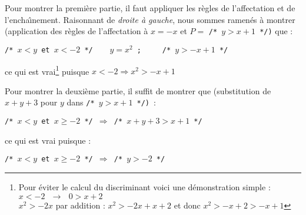 Pour montrer la premi\`ere partie, il faut appliquer les r\`egles de l'affectation
et de l'encha\^\i nement. Raisonnant de {\em droite \`a gauche}, nous sommes ramen\'es
\`a montrer (application des r\`egles de l'affectation \`a $x = -x$ et $P =$
{\tt  /* $y > x+1$ */)} que :
 
 {\tt /* $x<y$ et $x<-2$ */~~~~$y = x^{2}$ ; ~~~~/* $y>-x+1$ */ }

 ce qui est vrai\footnote{ Pour \'eviter le calcul du discriminant
 voici une d\'emonstration simple :
$  x < -2  \mbox{    }\rightarrow \mbox{    }  0 > x + 2  $\\ 
 $  x^{2} > -2x $ 
 par addition :
 $  x^{2}  > -2x +x +2 $ 
 et donc $ x^{2} > -x + 2 > -x + 1 $} puisque $x < -2 \Rightarrow x^{2}>-x+1$

 Pour montrer la deuxi\`eme partie, il suffit de montrer que (substitution de
 $x+y+3$ pour $y$ dans {\tt /*~$y>x+1$~*/)}~:
 
 {\tt /* $x<y$ et $x \geq -2$ */  $\Rightarrow $ /* $ x+y+3 > x+1$ */ }
 
 ce qui est vrai puisque :
 
 {\tt /* $x<y$ et $ x \geq -2$ */ $\Rightarrow $ /* $y>-2$ */ }

